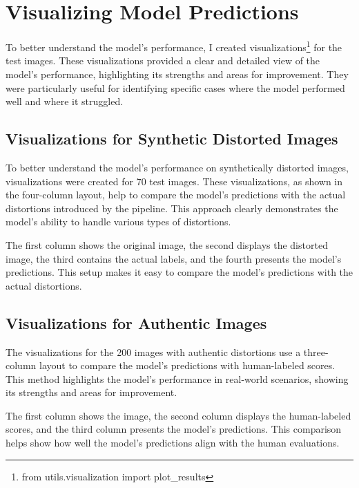 \section{Visualizing Model Predictions}
\label{sec:VisualizingPredictions}
To better understand the model’s performance, I created visualizations\footnote{from utils.visualization import plot\_results} for the test images. These visualizations provided a clear and detailed view of the model’s performance, highlighting its strengths and areas for improvement. They were particularly useful for identifying specific cases where the model performed well and where it struggled. \par
\subsection{Visualizations for Synthetic Distorted Images}
\label{subsec:SyntheticDistortedImages}
To better understand the model's performance on synthetically distorted images, visualizations were created for 70 test images. These visualizations, as shown in the four-column layout, help to compare the model's predictions with the actual distortions introduced by the pipeline. This approach clearly demonstrates the model's ability to handle various types of distortions. \par
\vspace{\baselineskip}
\noindent
The first column shows the original image, the second displays the distorted image, the third contains the actual labels, and the fourth presents the model’s predictions. This setup makes it easy to compare the model’s predictions with the actual distortions. \par

\subsection{Visualizations for Authentic Images}
\label{subsec:AuthenticImages}
The visualizations for the 200 images with authentic distortions use a three-column layout to compare the model's predictions with human-labeled scores. This method highlights the model's performance in real-world scenarios, showing its strengths and areas for improvement. \par
\vspace{\baselineskip}
\noindent
The first column shows the image, the second column displays the human-labeled scores, and the third column presents the model’s predictions. This comparison helps show how well the model’s predictions align with the human evaluations. \par

